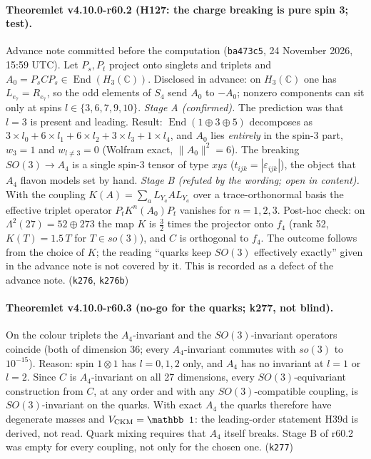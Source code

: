 \paragraph{Theoremlet v4.10.0-r60.2 (H127: the charge breaking is pure spin 3; test).}
Advance note committed before the computation (\texttt{ba473c5}, 24 November 2026, 15:59 UTC).  Let \(P_s,P_t\) project onto singlets and triplets
and \(A_0=P_sCP_s\in\operatorname{End}(H_3(\mathbb C))\).  Disclosed in advance: on \(H_3(\mathbb C)\) one has \(L_{e_7}=R_{e_7}\), so the odd elements of
\(S_4\) send \(A_0\) to \(-A_0\); nonzero components can sit only at spins \(l\in\{3,6,7,9,10\}\).
\emph{Stage A (confirmed).}  The prediction was that \(l=3\) is present and leading.  Result: \(\operatorname{End}(1\oplus3\oplus5)\) decomposes as
\(3\times l_0+6\times l_1+6\times l_2+3\times l_3+1\times l_4\), and \(A_0\) lies \emph{entirely} in the spin-3 part, \(w_3=1\) and \(w_{l\neq3}=0\) (Wolfram exact,
\(\|A_0\|^2=6\)).  The breaking \(SO(3)\to A_4\) is a single spin-3 tensor of type \(xyz\) (\(t_{ijk}=|\varepsilon_{ijk}|\)), the object that \(A_4\)
flavon models set by hand.
\emph{Stage B (refuted by the wording; open in content).}  With the coupling \(K(A)=\sum_aL_{Y_a}AL_{Y_a}\) over a trace-orthonormal basis the effective
triplet operator \(P_tK^n(A_0)P_t\) vanishes for \(n=1,2,3\).  Post-hoc check: on \(\Lambda^2(27)=52\oplus273\) the map \(K\) is \(\tfrac32\) times the
projector onto \(f_4\) (rank 52, \(K(T)=1.5\,T\) for \(T\in so(3)\)), and \(C\) is orthogonal to \(f_4\).  The outcome follows from the choice of \(K\); the
reading ``quarks keep \(SO(3)\) effectively exactly'' given in the advance note is not covered by it.  This is recorded as a defect of the advance
note.  (\texttt{k276}, \texttt{k276b})

\paragraph{Theoremlet v4.10.0-r60.3 (no-go for the quarks; k277, not blind).}
On the colour triplets the \(A_4\)-invariant and the \(SO(3)\)-invariant operators coincide (both of dimension 36; every \(A_4\)-invariant commutes
with \(so(3)\) to \(10^{-15}\)).  Reason: spin \(1\otimes1\) has \(l=0,1,2\) only, and \(A_4\) has no invariant at \(l=1\) or \(l=2\).  Since \(C\) is
\(A_4\)-invariant on all 27 dimensions, every \(SO(3)\)-equivariant construction from \(C\), at any order and with any \(SO(3)\)-compatible coupling, is
\(SO(3)\)-invariant on the quarks.  With exact \(A_4\) the quarks therefore have degenerate masses and \(V_{\rm CKM}=\mathbb 1\): the leading-order
statement H39d is derived, not read.  Quark mixing requires that \(A_4\) itself breaks.  Stage B of r60.2 was empty for every coupling, not only for
the chosen one.  (\texttt{k277})

